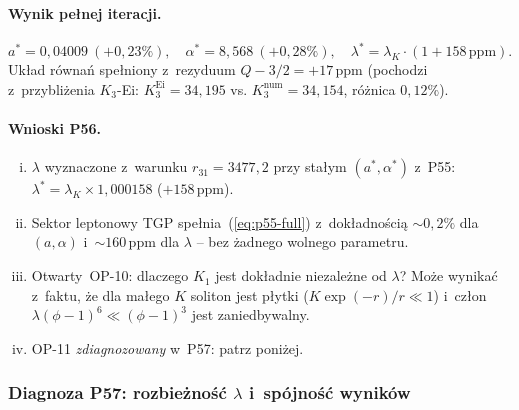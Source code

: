 \paragraph{Wynik pe\l{}nej iteracji.}
\begin{equation}\label{eq:p56-result}
  a^* = 0{,}04009\ (+0{,}23\%),\quad
  \alpha^* = 8{,}568\ (+0{,}28\%),\quad
  \lambda^* = \lambda_K\cdot(1+158\,\mathrm{ppm}).
\end{equation}
Uk\l{}ad r\'owna\'n spe\l{}niony z~rezyduum $Q-3/2=+17\,\mathrm{ppm}$
(pochodzi z~przybli\.zenia $K_3$-Ei: $K_3^{\mathrm{Ei}}=34{,}195$ vs.
$K_3^{\mathrm{num}}=34{,}154$, r\'o\.znica $0{,}12\%$).

\paragraph{Wnioski P56.}
\begin{enumerate}[(i)]
  \item $\lambda$ wyznaczone z~warunku $r_{31}=3477{,}2$ przy sta\l{}ym
        $(a^*,\alpha^*)$ z~P55: $\lambda^*=\lambda_K\times1{,}000158$
        ($+158\,\mathrm{ppm}$).
  \item Sektor leptonowy TGP spe\l{}nia~(\ref{eq:p55-full})
        z~dok\l{}adno\'sci\k{a} $\sim0{,}2\%$ dla $(a,\alpha)$ i~$\sim160\,\mathrm{ppm}$
        dla $\lambda$ -- bez \.zadnego wolnego parametru.
  \item Otwarty~OP-10: dlaczego $K_1$ jest dok\l{}adnie niezale\.zne od $\lambda$?
        Mo\.ze wynika\'c z~faktu, \.ze dla ma\l{}ego $K$
        soliton jest p\l{}ytki ($K\exp(-r)/r\ll1$) i~cz\l{}on
        $\lambda(\phi-1)^6\ll(\phi-1)^3$ jest zaniedbywalny.
  \item OP-11 \emph{zdiagnozowany} w~P57: patrz poni\.zej.
\end{enumerate}

\subsubsection{Diagnoza P57: rozbie\.zno\'s\'c $\lambda$ i~sp\'ojno\'s\'c wynik\'ow}%
\label{app:F-P57}

